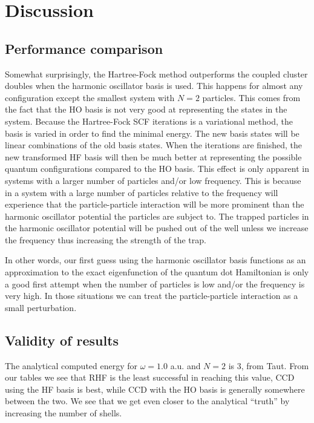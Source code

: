\documentclass[
    a4paper, aps, twocolumn, floatfix, superscriptaddress,
    nofootinbib]{revtex4-1}
\newcommand{\1}{\mathds{1}}
\begin{document}
\section{Discussion}

    \subsection{Performance comparison}
        Somewhat surprisingly, the Hartree-Fock method outperforms the coupled
        cluster doubles when the harmonic oscillator basis is used. This happens
        for almost any configuration except the smallest system with $N=2$
        particles. This comes from the fact that the HO basis is not very good
        at representing the states in the system. Because the Hartree-Fock SCF
        iterations is a variational method, the basis is varied in order to find
        the minimal energy. The new basis states will be linear combinations of
        the old basis states. When the iterations are finished, the new
        transformed HF basis will then be much better at representing the
        possible quantum configurations compared to the HO basis. This effect is
        only apparent in systems with a larger number of particles and/or low
        frequency. This is because in a system with a large number of particles
        relative to the frequency will experience that the particle-particle
        interaction will be more prominent than the harmonic oscillator
        potential the particles are subject to. The trapped
        particles in the harmonic oscillator potential will be pushed out of the
        well unless we increase the frequency thus increasing the strength of
        the trap.

        In other words, our first guess using the harmonic oscillator basis
        functions as an approximation to the exact eigenfunction of the quantum
        dot Hamiltonian is only a good first attempt when the number of
        particles is low and/or the frequency is very high. In those situations
        we can treat the particle-particle interaction as a small perturbation.

    \subsection{Validity of results}
        The analytical computed energy for $\omega=1.0$ a.u.  and $N=2$ is $3$,
        from Taut\cite{taut1994two}. From our tables we see that RHF is the
        least successful in reaching this value, CCD using the HF basis is best,
        while CCD with the HO basis is generally somewhere between the two. We
        see that we get even closer to the analytical ``truth'' by increasing
        the number of shells.
\end{document}
